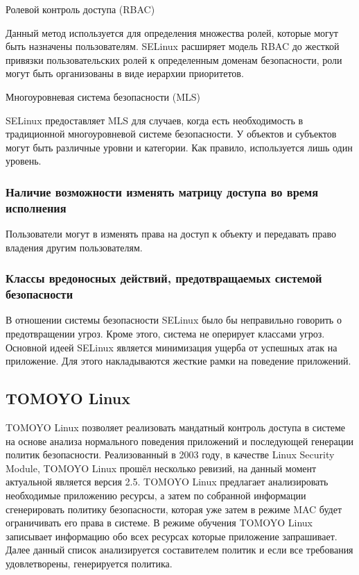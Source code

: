 \bigskip
Ролевой контроль доступа (RBAC) 

Данный метод используется для определения множества ролей, которые могут
быть назначены пользователям. SELinux расширяет модель RBAC до жесткой
привязки пользовательских ролей к определенным доменам безопасности,
роли могут быть организованы в виде иерархии приоритетов.  

\bigskip
Многоуровневая система безопасности (MLS) 

SELinux предоставляет MLS для случаев, когда есть 
необходимость в традиционной многоуровневой системе 
безопасности. У объектов и субъектов могут быть 
различные уровни и категории. 
Как правило, используется лишь один уровень. 

\subsubsection{Наличие возможности изменять матрицу доступа 
	во время исполнения} 

Пользователи могут в изменять права на доступ к объекту и передавать
право владения другим пользователям.

\subsubsection{Классы вредоносных действий, предотвращаемых 
	системой безопасности} 

В отношении системы безопасности SELinux было бы неправильно 
говорить о предотвращении угроз. Кроме этого, система не 
оперирует классами угроз. Основной идеей SELinux является 
минимизация ущерба от успешных атак на приложение. Для 
этого накладываются жесткие рамки на поведение приложений. 

\bigskip
\subsection{TOMOYO Linux} 
TOMOYO Linux позволяет реализовать мандатный контроль доступа в системе
на основе анализа нормального поведения приложений и последующей
генерации политик безопасности. Реализованный в 2003 году, в качестве
Linux Security Module, TOMOYO Linux прошёл несколько ревизий, на данный
момент актуальной является версия 2.5. TOMOYO Linux предлагает
анализировать необходимые приложению ресурсы, а затем по собранной
информации сгенерировать политику безопасности, которая уже затем в
режиме MAC будет ограничивать его права в системе. В режиме обучения
TOMOYO Linux записывает информацию обо всех ресурсах которые приложение
запрашивает. Далее данный список анализируется составителем политик и
если все требования удовлетворены, генерируется политика.


